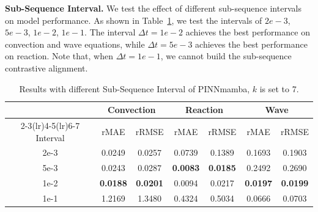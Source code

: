 \documentclass{article}
\theoremstyle{plain}
\theoremstyle{definition}
\theoremstyle{remark}
\begin{document}
\textbf{Sub-Sequence Interval.}  We test the effect of different sub-sequence intervals on model performance. As shown in Table~\ref{tab:interval}, we test the intervals of $2e-3$, $5e-3$, $1e-2$, $1e-1$. The interval $\Delta t =1e-2$ achieves the best performance on convection and wave equations, while $\Delta t = 5e-3$ achieves the best performance on reaction. Note that, when $\Delta t = 1e-1$, we cannot build the sub-sequence contrastive alignment.
\begin{table}[H]
\vspace{-3mm}
  \caption{Results with different Sub-Sequence Interval of PINNmamba, $k$ is set to 7.}
  
  \centering
    \small
  \begin{tabular}{c|cc|cc|cc}

    \toprule 
      &\multicolumn{2}{c}{Convection }&\multicolumn{2}{c}{Reaction}&\multicolumn{2}{c}{Wave}\\
    \cmidrule(lr){2-3}\cmidrule(lr){4-5}\cmidrule(lr){6-7}
   Interval & rMAE & rRMSE & rMAE & rRMSE & rMAE & rRMSE\\
   \midrule
   2e-3 &0.0249& 0.0257 & 0.0739 & 0.1389 &0.1693 &0.1903  \\
 5e-3 & 0.0243& 0.0287& \textbf{0.0083} & \textbf{0.0185} & 0.2492 & 0.2690 \\
 1e-2 &\textbf{0.0188} & \textbf{0.0201} &0.0094 &0.0217 & \textbf{0.0197} &  \textbf{0.0199}\\
 1e-1 & 1.2169 &1.3480 &0.4324& 0.5034   &0.0666 &  0.0703\\

    

   

    \bottomrule
  \end{tabular}
  \normalsize
  \label{tab:interval}

\end{table}
\end{document}
